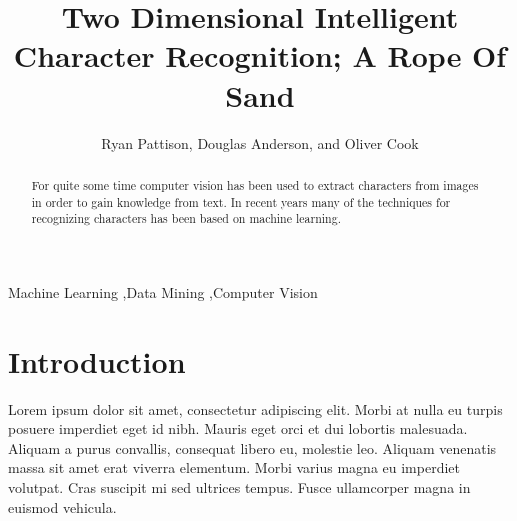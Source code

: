 \documentclass[final,5p,times,twocolumn]{elsarticle}
\begin{document}
\begin{frontmatter}



\title{Two Dimensional Intelligent Character Recognition; A Rope Of Sand}


\author{Ryan Pattison, Douglas Anderson, and Oliver Cook}

\address{ryan.m.pattison@gmail.com, dander01@guelph.ca, cooko@uoguelph.ca}

\begin{abstract}

For quite some time computer vision has been used to extract characters from
images in order to gain knowledge from text. In recent years many of the
techniques for recognizing characters has been based on machine learning.

\end{abstract}

\begin{keyword}
Machine Learning \sep Data Mining \sep Computer Vision

\end{keyword}

\end{frontmatter}


\section{Introduction}
\label{intro}
Lorem ipsum dolor sit amet, consectetur adipiscing elit. Morbi at nulla eu
turpis posuere imperdiet eget id nibh. Mauris eget orci et dui lobortis
malesuada. Aliquam a purus convallis, consequat libero eu, molestie leo.
Aliquam venenatis massa sit amet erat viverra elementum. Morbi varius magna eu
imperdiet volutpat. Cras suscipit mi sed ultrices tempus. Fusce ullamcorper
magna in euismod vehicula.
\end{document}
